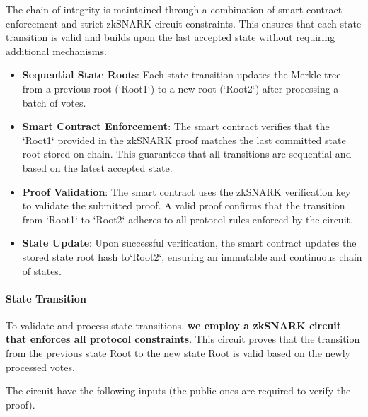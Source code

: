 The chain of integrity is maintained through a combination of smart contract enforcement and strict zkSNARK circuit constraints. This ensures that each state transition is valid and builds upon the last accepted state without requiring additional mechanisms.

\begin{itemize}
	\item \textbf{Sequential State Roots}: Each state transition updates the Merkle tree from a previous root (`Root1`) to a new root (`Root2`) after processing a batch of votes.
	\item \textbf{Smart Contract Enforcement}: The smart contract verifies that the `Root1` provided in the zkSNARK proof matches the last committed state root stored on-chain. This guarantees that all transitions are sequential and based on the latest accepted state.
	\item \textbf{Proof Validation}: The smart contract uses the zkSNARK verification key to validate the submitted proof. A valid proof confirms that the transition from `Root1` to `Root2` adheres to all protocol rules enforced by the circuit.
	\item \textbf{State Update}: Upon successful verification, the smart contract updates the stored state root hash to`Root2`, ensuring an immutable and continuous chain of states.
\end{itemize}

\paragraph{State Transition}

To validate and process state transitions, \textbf{we employ a zkSNARK circuit that enforces all protocol constraints}. This circuit proves that the transition from the previous state Root to the new state Root is valid based on the newly processed votes.

\begin{figure}[H]
	\centering
\end{figure}

The circuit have the following inputs (the public ones are required to verify the proof).


